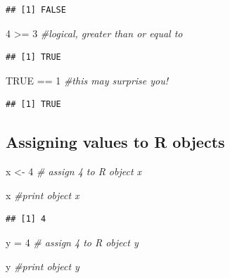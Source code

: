 \documentclass[
]{article}
\newenvironment{Shaded}{\begin{snugshade}}{\end{snugshade}}
\newcommand{\CommentTok}[1]{\textcolor[rgb]{0.56,0.35,0.01}{\textit{#1}}}
\newcommand{\ConstantTok}[1]{\textcolor[rgb]{0.00,0.00,0.00}{#1}}
\newcommand{\DecValTok}[1]{\textcolor[rgb]{0.00,0.00,0.81}{#1}}
\newcommand{\NormalTok}[1]{#1}
\newcommand{\OtherTok}[1]{\textcolor[rgb]{0.56,0.35,0.01}{#1}}
\newcommand{\SpecialCharTok}[1]{\textcolor[rgb]{0.00,0.00,0.00}{#1}}
\begin{document}
\begin{verbatim}
## [1] FALSE
\end{verbatim}

\begin{Shaded}
\begin{Highlighting}[]
\DecValTok{4} \SpecialCharTok{\textgreater{}=} \DecValTok{3} \CommentTok{\#logical, greater than or equal to}
\end{Highlighting}
\end{Shaded}

\begin{verbatim}
## [1] TRUE
\end{verbatim}

\begin{Shaded}
\begin{Highlighting}[]
\ConstantTok{TRUE} \SpecialCharTok{==} \DecValTok{1} \CommentTok{\#this may surprise you!}
\end{Highlighting}
\end{Shaded}

\begin{verbatim}
## [1] TRUE
\end{verbatim}

\hypertarget{assigning-values-to-r-objects}{%
\subsection{Assigning values to R
objects}\label{assigning-values-to-r-objects}}

\begin{Shaded}
\begin{Highlighting}[]
\NormalTok{x }\OtherTok{\textless{}{-}} \DecValTok{4} \CommentTok{\# assign 4 to R object x}

\NormalTok{x }\CommentTok{\#print object x}
\end{Highlighting}
\end{Shaded}

\begin{verbatim}
## [1] 4
\end{verbatim}

\begin{Shaded}
\begin{Highlighting}[]
\NormalTok{y }\OtherTok{=} \DecValTok{4} \CommentTok{\# assign 4 to R object y}

\NormalTok{y }\CommentTok{\#print object y}
\end{Highlighting}
\end{Shaded}
\end{document}

